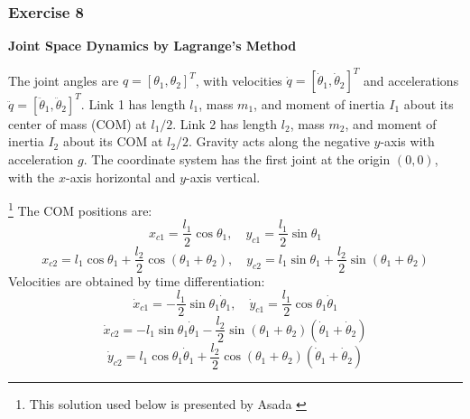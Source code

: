 \documentclass[12pt,a4paper]{article}
\begin{document}
\subsubsection*{Exercise 8}

\textbf{Joint Space Dynamics by Lagrange’s Method}

The joint angles are \( q = [\theta_1, \theta_2]^T \), with velocities \( \dot{q} = [\dot{\theta}_1, \dot{\theta}_2]^T \) and accelerations \( \ddot{q} = [\ddot{\theta}_1, \ddot{\theta}_2]^T \). Link 1 has length \( l_1 \), mass \( m_1 \), and moment of inertia \( I_1 \) about its center of mass (COM) at \( l_1/2 \). Link 2 has length \( l_2 \), mass \( m_2 \), and moment of inertia \( I_2 \) about its COM at \( l_2/2 \). Gravity acts along the negative \( y \)-axis with acceleration \( g \). The coordinate system has the first joint at the origin \((0, 0)\), with the \( x \)-axis horizontal and \( y \)-axis vertical.

\footnote{This solution used below is presented by Asada \cite[Eq.~7-64]{Asada2022}}
The COM positions are:
\[
x_{c1} = \frac{l_1}{2} \cos \theta_1, \quad y_{c1} = \frac{l_1}{2} \sin \theta_1
\]
\[
x_{c2} = l_1 \cos \theta_1 + \frac{l_2}{2} \cos (\theta_1 + \theta_2), \quad y_{c2} = l_1 \sin \theta_1 + \frac{l_2}{2} \sin (\theta_1 + \theta_2)
\]
Velocities are obtained by time differentiation:
\[
\dot{x}_{c1} = -\frac{l_1}{2} \sin \theta_1 \dot{\theta}_1, \quad \dot{y}_{c1} = \frac{l_1}{2} \cos \theta_1 \dot{\theta}_1
\]
\[
\dot{x}_{c2} = -l_1 \sin \theta_1 \dot{\theta}_1 - \frac{l_2}{2} \sin (\theta_1 + \theta_2) (\dot{\theta}_1 + \dot{\theta}_2)
\]
\[
\dot{y}_{c2} = l_1 \cos \theta_1 \dot{\theta}_1 + \frac{l_2}{2} \cos (\theta_1 + \theta_2) (\dot{\theta}_1 + \dot{\theta}_2)
\]
\end{document}
